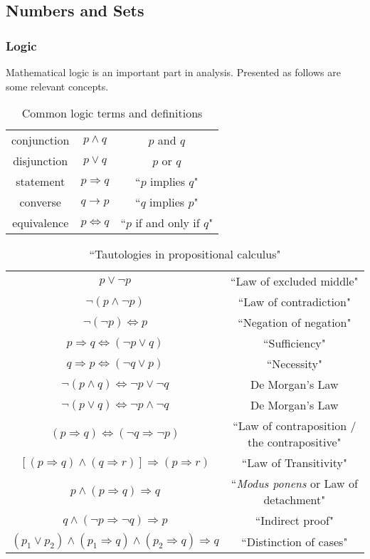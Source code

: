\subsection{Numbers and Sets}
\subsubsection{Logic}
Mathematical logic is an important part in analysis.
Presented as follows are some relevant concepts. 

\begin{table}[h!]
    \centering
    \caption{Common logic terms and definitions}
    
    \begin{tabular}{c|c|c}
        conjunction & $p \land q$ & $p$ and $q$ \\
        disjunction & $p \lor q$ & $p$ or $q$ \\
        statement & $p \Longrightarrow q$ & ``$p$ implies $q$" \\
        converse & $q \longrightarrow p$ & ``$q$ implies $p$" \\
        equivalence & $p \iff q$ & ``$p$ if and only if $q$"
    \end{tabular}
\end{table}

\begin{table}[h!]
    \centering
    \caption{``Tautologies in propositional calculus"}
    \begin{tabular}{c|c}
        $p \lor \neg p$ & ``Law of excluded middle" \\
        $\neg (p \land \neg p)$ & ``Law of contradiction" \\
        $\neg (\neg p) \iff p$ & ``Negation of negation" \\
        $p \Longrightarrow q \iff (\neg p \lor q)$ & ``Sufficiency" \\
        $q \Longrightarrow p \iff (\neg q \lor p)$ & ``Necessity" \\
        $\neg (p \land q) \iff \neg p \lor \neg q$ & De Morgan's Law \\
        $\neg (p \lor q) \iff \neg p \land \neg q$ & De Morgan's Law \\
        $(p \Longrightarrow q) \iff (\neg q \Longrightarrow \neg p)$ & ``Law of contraposition / the contrapositive" \\
        $[(p \Longrightarrow q) \land (q \Longrightarrow r)] \Longrightarrow (p \Longrightarrow r)$ & ``Law of Transitivity" \\
        $p \land (p \Longrightarrow q) \Longrightarrow q$ & ``\textit{Modus ponens} or Law of detachment" \\
        $q \land (\neg p \Longrightarrow \neg q) \Longrightarrow p$ & ``Indirect proof" \\
        $(p_1 \lor p_2) \land (p_1 \Longrightarrow q) \land (p_2 \Longrightarrow q) \Longrightarrow q$ & ``Distinction of cases"
    \end{tabular}
\end{table}

